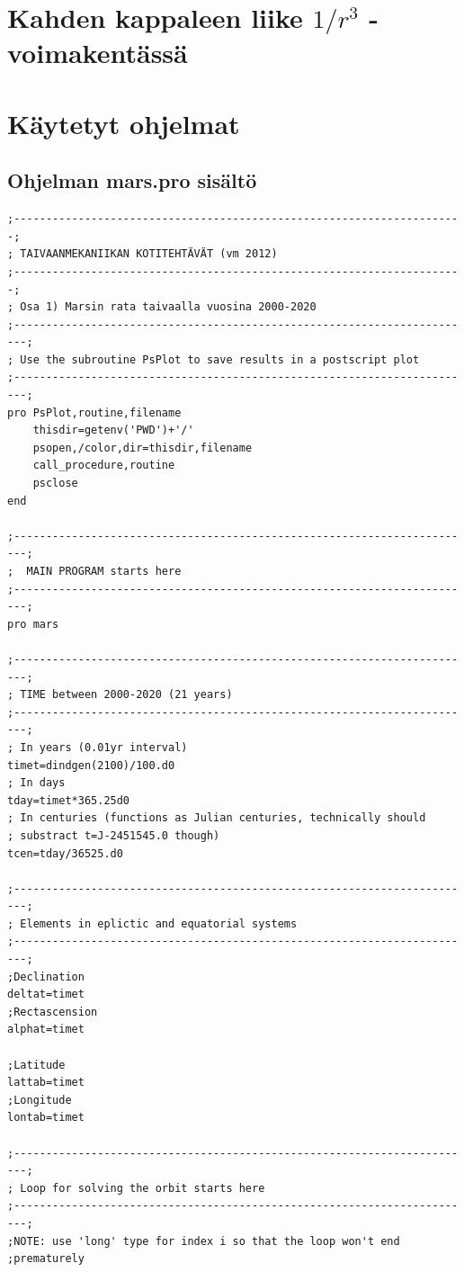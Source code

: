 \documentclass[12pt, a4paper]{article}
\begin{document}
\newpage
\section[Tehtävä 2b]{Kahden kappaleen liike $1/r^3$ -voimakentässä}

\newpage
\section{Käytetyt ohjelmat}

\subsection[Koodi1]{Ohjelman mars.pro sisältö}\label{Koodi1}
\begin{scriptsize}
\begin{verbatim}
;----------------------------------------------------------------------;
; TAIVAANMEKANIIKAN KOTITEHTÄVÄT (vm 2012)
;----------------------------------------------------------------------;
; Osa 1) Marsin rata taivaalla vuosina 2000-2020
;------------------------------------------------------------------------;
; Use the subroutine PsPlot to save results in a postscript plot 
;------------------------------------------------------------------------;
pro PsPlot,routine,filename
	thisdir=getenv('PWD')+'/'
	psopen,/color,dir=thisdir,filename
	call_procedure,routine
	psclose		
end

;------------------------------------------------------------------------;
;  MAIN PROGRAM starts here
;------------------------------------------------------------------------;
pro mars

;------------------------------------------------------------------------;
; TIME between 2000-2020 (21 years)
;------------------------------------------------------------------------;
; In years (0.01yr interval)
timet=dindgen(2100)/100.d0
; In days
tday=timet*365.25d0
; In centuries (functions as Julian centuries, technically should
; substract t=J-2451545.0 though)
tcen=tday/36525.d0

;------------------------------------------------------------------------;
; Elements in eplictic and equatorial systems
;------------------------------------------------------------------------;
;Declination
deltat=timet
;Rectascension
alphat=timet

;Latitude
lattab=timet
;Longitude
lontab=timet

;------------------------------------------------------------------------;
; Loop for solving the orbit starts here
;------------------------------------------------------------------------;
;NOTE: use 'long' type for index i so that the loop won't end
;prematurely


\end{verbatim}
\end{scriptsize}
\end{document}

